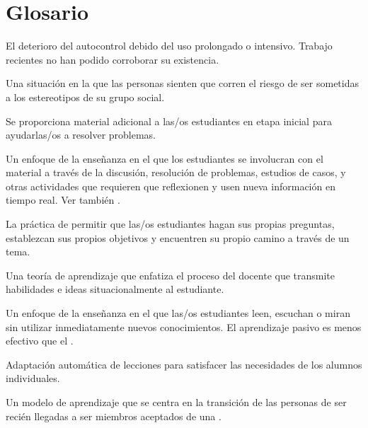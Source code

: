 \chapter{Glosario}\label{s:gloss}

\begin{description}

 El deterioro del autocontrol debido del uso prolongado o intensivo. 
Trabajo recientes no han podido corroborar su existencia.

 Una situación en la que las personas sienten que corren el riesgo de ser sometidas a los estereotipos de su grupo social.

 Se proporciona material adicional a las/os estudiantes 
en etapa inicial para ayudarlas/os a resolver problemas.

 Un enfoque de la enseñanza en el que
los estudiantes se involucran con el material a través de la discusión, resolución de problemas, estudios de casos,
y otras actividades que requieren que reflexionen y usen nueva información en
tiempo real. Ver también .

 La práctica de permitir que las/os estudiantes hagan sus propias preguntas, establezcan sus propios objetivos y encuentren su propio camino a través de un tema.

 Una teoría de
aprendizaje que enfatiza el proceso del docente que transmite habilidades e ideas
situacionalmente al estudiante.

 Un enfoque de la enseñanza en el que las/os estudiantes leen, escuchan o miran sin utilizar inmediatamente nuevos conocimientos. El aprendizaje pasivo es menos efectivo que el .

 Adaptación automática de lecciones para satisfacer las necesidades de los alumnos individuales.

 Un modelo de aprendizaje que se centra en la transición de las personas de ser recién llegadas a ser miembros aceptados de una
.


\end{description}
